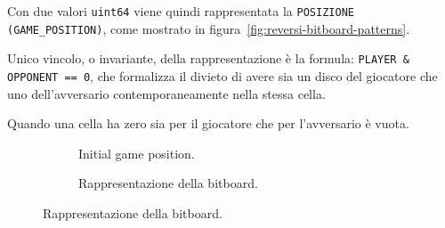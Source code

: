 Con due valori \texttt{uint64} viene quindi rappresentata la \texttt{POSIZIONE (GAME\_POSITION)}, come mostrato in figura~\ref{fig:reversi-bitboard-patterns}.

Unico vincolo, o invariante, della rappresentazione è la formula: \texttt{PLAYER \& OPPONENT == 0},
che formalizza il divieto di avere sia un disco del giocatore che uno dell'avversario contemporaneamente nella stessa cella.

Quando una cella ha zero sia per il giocatore che per l'avversario è vuota.

\begin{figure}[htbp]
  \centering
  \begin{subfigure}[b]{0.45\textwidth}
    \centering
    \caption{Initial game position.}
  \end{subfigure}
  \hfill
  \begin{subfigure}[b]{0.45\textwidth}
    \centering
    \caption{Rappresentazione della bitboard.}
  \end{subfigure}


\end{figure}
